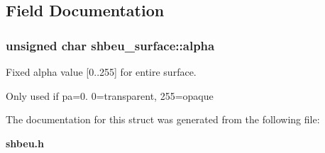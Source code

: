 \subsection{Field Documentation}
\subsubsection[{alpha}]{\setlength{\rightskip}{0pt plus 5cm}unsigned char {\bf shbeu\_\-surface::alpha}}\label{structshbeu__surface_ad25a95ce72188eb5124818cff877c6c9}


Fixed alpha value [0..255] for entire surface. 

Only used if pa=0. 0=transparent, 255=opaque 

The documentation for this struct was generated from the following file:\begin{DoxyCompactItemize}
\item 
{\bf shbeu.h}\end{DoxyCompactItemize}
